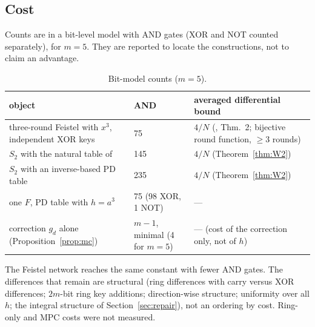 \subsection{Cost}
Counts are in a bit-level model with AND gates (XOR and NOT counted separately), for $m=5$. They are
reported to locate the constructions, not to claim an advantage.
\begin{table}[ht]\small
\caption{Bit-model counts ($m=5$).}\label{tab:cost}
\begin{tabular}{p{}p{}p{}}
\toprule
object & AND & averaged differential bound\\
\midrule
three-round Feistel with $x^3$, independent XOR keys & 75 & $4/N$ (\cite{AO}, Thm.~2; bijective round function, $\ge3$ rounds)\\
$S_2$ with the natural table of \cite{FukuiFFA} & 145 & $4/N$ (Theorem~\ref{thm:W2})\\
$S_2$ with an inverse-based PD table & 235 & $4/N$ (Theorem~\ref{thm:W2})\\
one $F$, PD table with $h=a^3$ & 75 (98 XOR, 1 NOT) & ---\\
correction $g_d$ alone (Proposition~\ref{prop:mc}) & $m-1$, minimal (4 for $m=5$) & --- (cost of the correction only, not of $h$)\\
\bottomrule
\end{tabular}
\end{table}
The Feistel network reaches the same constant with fewer AND gates. The differences that remain are
structural (ring differences with carry versus XOR differences; $2m$-bit ring key additions; direction-wise
structure; uniformity over all $h$; the integral structure of Section~\ref{sec:repair}), not an ordering by
cost. Ring-only and MPC costs were not measured.
\clearpage
